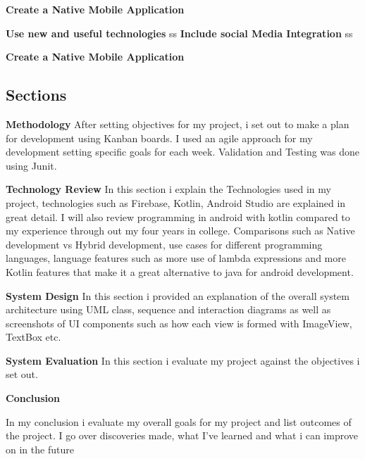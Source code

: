 \textbf {Create a Native Mobile Application} 
\newline

\textbf {Use new and useful technologies}
ss \newline
\textbf {Include social Media Integration}
ss \newline

\textbf {Create a Native Mobile Application} \newline

\newpage

\subsection{Sections}

\textbf {Methodology}
After setting objectives for my project, i set out to make a plan for development using Kanban boards. I used an agile approach for my development setting specific goals for each week. Validation and Testing was done using Junit.
\newline


\textbf {Technology Review}
In this section i explain the Technologies used in my project, technologies such as Firebase, Kotlin, Android Studio are explained in great detail. I will also review programming in android with kotlin compared to my experience through out my four years in college. Comparisons such as Native development vs Hybrid development, use cases for different programming languages, language features such as more use of lambda expressions and more Kotlin features that make it a great alternative to java for android development.
\newline


\textbf {System Design}
In this section i provided an explanation of the overall system architecture using UML class, sequence and interaction diagrams as well as screenshots of UI components such as how each view is formed with ImageView, TextBox etc. \newline

\textbf {System Evaluation}
  In this section i evaluate my project against the objectives i set out. \newline

\textbf {Conclusion}

 In my conclusion i evaluate my overall goals for my project and list outcomes of the project. I go over discoveries made, what I've learned and what i can improve on in the future \newline

